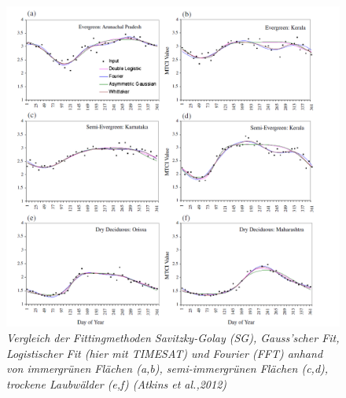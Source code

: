 \documentclass[11pt]{report}
\begin{document}
\begin{figure}[H]
\centering
\includegraphics[scale=0.6]{./Grafiken/Fitting/Atkinson_et_al_Vergleich_FFT_SG_LOG_GAU_6locations.PNG}
\caption{\textit{Vergleich der Fittingmethoden Savitzky-Golay (SG), Gauss'scher Fit, Logistischer Fit (hier mit TIMESAT) und Fourier (FFT) anhand von immergrünen Flächen (a,b), semi-immergrünen Flächen (c,d), trockene Laubwälder (e,f)  (Atkins et al.,2012)}}
\end{figure}
\end{document}
